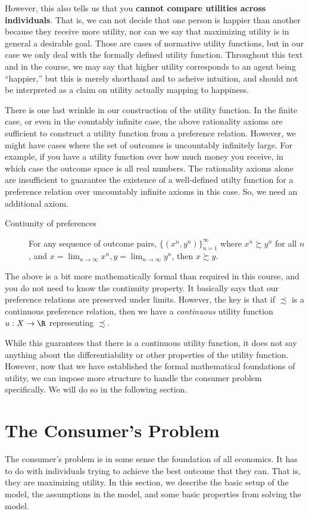 However, this also tells us that you \textbf{cannot compare utilities across individuals}. That is, we can not decide that one person is happier than another because they receive more utility, nor can we say that maximizing utility is in general a desirable goal. Those are cases of normative utility functions, but in our case we only deal with the formally defined utility function. Throughout this text and in the course, we may say that higher utility corresponds to an agent being ``happier,'' but this is merely shorthand and to acheive intuition, and should not be interpreted as a claim on utility actually mapping to happiness. 

There is one last wrinkle in our construction of the utility function. In the finite case, or even in the countably infinite case, the above rationality axioms are sufficient to construct a utility function from a preference relation. However, we might have cases where the set of outcomes is uncountably infinitely large. For example, if you have a utility function over how much money you receive, in which case the outcome space is all real numbers. The rationality axioms alone are insufficient to guarantee the existence of a well-defined utilty function for a preference relation over uncountably infinite axioms in this case. So, we need an additional axiom.
\begin{description}
    \item[Contiunity of preferences] For any sequence of outcome pairs, $\{(x^n, y^n)\}_{n = 1}^\infty$ where $x^n \succsim y^n$ for all $n$, and $x = \lim_{n \to \infty} x^n, y = \lim_{n \to \infty} y^n$, then $x \succsim y$. 
\end{description}
The above is a bit more mathematically formal than required in this course, and you do not need to know the continuity property. It basically says that our preference relations are preserved under limits. However, the key is that if $\precsim$ is a continuous preference relation, then we have a \emph{continuous} utility function $u: X \to \R$ representing $\precsim$. 

While this guarantees that there is a continuous utility function, it does not say anything about the differentiability or other properties of the utility function. However, now that we have established the formal mathematical foundations of utility, we can impose more structure to handle the consumer problem specifically. We will do so in the following section.

\section{The Consumer's Problem}
The consumer's problem is in some sense the foundation of all economics. It has to do with individuals trying to achieve the best outcome that they can. That is, they are maximizing utility. In this section, we describe the basic setup of the model, the assumptions in the model, and some basic properties from solving the model.

